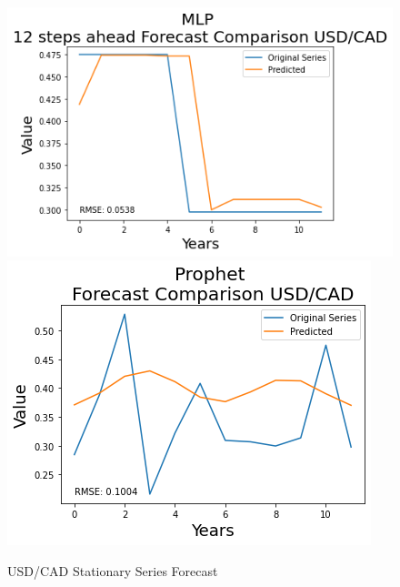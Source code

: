 \documentclass[10pt,twocolumn,letterpaper]{article}
\begin{document}
\begin{figure}[h]
		\includegraphics[width=0.45\linewidth]{../img/MLP/usd_cad_diff_for}
		\includegraphics[width=0.45\linewidth]{../img/Prophet/usd_cad_diff_for}
		\caption{USD/CAD Stationary Series Forecast}
		\label{fig:usd_caddiffforecast}
	\end{figure}
	
\end{document}

